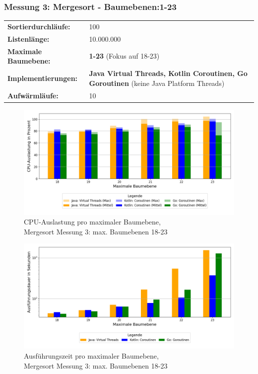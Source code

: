 \documentclass[fontsize=12pt,paper=a4,twoside=semi,parskip=half-,headsepline,headinclude]{scrreprt}
\begin{document}
\subsubsection{Messung 3: Mergesort - Baumebenen:1-23}

\begin{tabularx}{\textwidth}{@{}lX@{}}
	\textbf{Sortierdurchläufe:} & 100 \\
	\textbf{Listenlänge:} & 10.000.000 \\
	\textbf{Maximale Baumebene:} & \textbf{1-23} (Fokus auf 18-23) \\
	\textbf{Implementierungen:} & \textbf{Java Virtual Threads, Kotlin Coroutinen, Go Goroutinen} (keine Java Platform Threads) \\
	\textbf{Aufwärmläufe:} & 10
\end{tabularx}

\begin{figure}[H]
	\centering
	\includegraphics[scale=0.5]{figures/mergesort/Maximalebauebenen1-23_vcg/cpu_usage_bar_plot.png}
	\caption{CPU-Auslastung pro maximaler Baumebene,\\ Mergesort Messung 3: max. Baumebenen 18-23}
	\label{fig:ms1-23CPU}
\end{figure}

\begin{figure}[H]
	\centering
	\includegraphics[scale=0.5]{figures/mergesort/Maximalebauebenen1-23_vcg/execution_time_plot.png}
	\caption{Ausführungszeit pro maximaler Baumebene,\\ Mergesort Messung 3: max. Baumebenen 18-23}
	\label{fig:ms1-23Zeit}
\end{figure}
\end{document}
